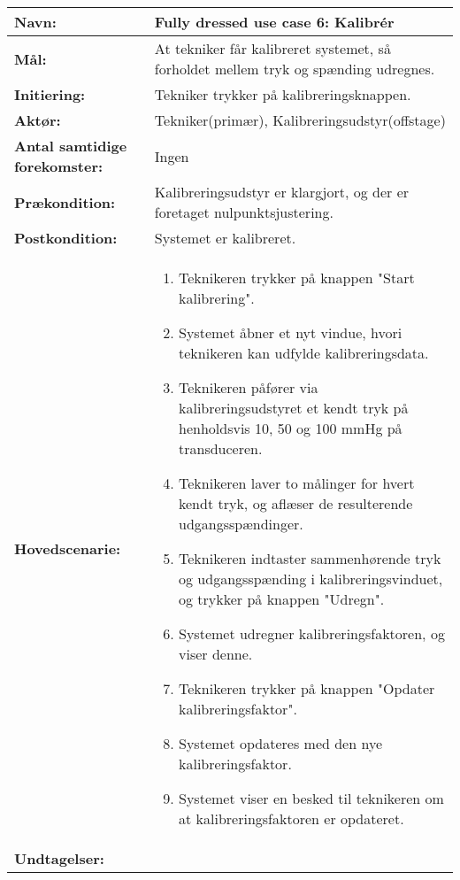\subsection{}
\begin{table}[H]
\begin{tabular}{|l|p{10cm}|}
\hline
\textbf{Navn:} & \textbf{Fully dressed use case 6: Kalibrér}\\\hline
\textbf{Mål:} & At tekniker får kalibreret systemet, så forholdet mellem tryk og spænding udregnes.  \\\hline
\textbf{Initiering:} & Tekniker trykker på kalibreringsknappen. \\\hline
\textbf{Aktør:} & Tekniker(primær), Kalibreringsudstyr(offstage) \\\hline
\textbf{Antal samtidige forekomster:} & Ingen \\\hline
\textbf{Prækondition:} & Kalibreringsudstyr er klargjort, og der er foretaget nulpunktsjustering. 
\\\hline
\textbf{Postkondition:} & Systemet er kalibreret.\\\hline
\textbf{Hovedscenarie:} &
{\begin{enumerate}
\item{Teknikeren trykker på knappen "Start kalibrering".}
\item{Systemet åbner et nyt vindue, hvori teknikeren kan udfylde kalibreringsdata.}
\item{Teknikeren påfører via kalibreringsudstyret et kendt tryk på henholdsvis 10, 50 og 100 mmHg på transduceren.} 
\item {Teknikeren laver to målinger for hvert kendt tryk, og aflæser de resulterende udgangsspændinger.}
\item {Teknikeren indtaster sammenhørende tryk og udgangsspænding i kalibreringsvinduet, og trykker på knappen "Udregn".}
\item {Systemet udregner kalibreringsfaktoren, og viser denne.}
\item {Teknikeren trykker på knappen "Opdater kalibreringsfaktor".}
\item {Systemet opdateres med den nye kalibreringsfaktor.}
\item {Systemet viser en besked til teknikeren om at kalibreringsfaktoren er opdateret.}
\end{enumerate}}\\\hline
\textbf{Undtagelser:}&
\\\hline
\end{tabular}
\end{table}